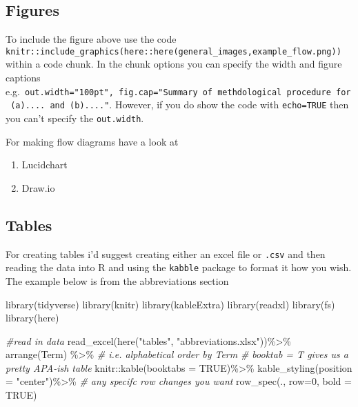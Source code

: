 \documentclass[
  12pt,
  oneside]{book}
\newenvironment{Shaded}{\begin{snugshade}}{\end{snugshade}}
\newcommand{\AttributeTok}[1]{\textcolor[rgb]{0.77,0.63,0.00}{#1}}
\newcommand{\CommentTok}[1]{\textcolor[rgb]{0.56,0.35,0.01}{\textit{#1}}}
\newcommand{\ConstantTok}[1]{\textcolor[rgb]{0.00,0.00,0.00}{#1}}
\newcommand{\DecValTok}[1]{\textcolor[rgb]{0.00,0.00,0.81}{#1}}
\newcommand{\FunctionTok}[1]{\textcolor[rgb]{0.00,0.00,0.00}{#1}}
\newcommand{\NormalTok}[1]{#1}
\newcommand{\SpecialCharTok}[1]{\textcolor[rgb]{0.00,0.00,0.00}{#1}}
\newcommand{\StringTok}[1]{\textcolor[rgb]{0.31,0.60,0.02}{#1}}
\providecommand{\tightlist}{%
  \setlength{\itemsep}{0pt}\setlength{\parskip}{0pt}}
\begin{document}
\hypertarget{figures-1}{%
\subsection{Figures}\label{figures-1}}

To include the figure above use the code \texttt{knitr::include\_graphics(here::here(\textquotesingle{}general\_images\textquotesingle{},\textquotesingle{}example\_flow.png\textquotesingle{}))} within a code chunk. In the chunk options you can specify the width and figure captions e.g.~\texttt{out.width="100pt",\ fig.cap="Summary\ of\ methdological\ procedure\ for\ (a)....\ and\ (b)...."}. However, if you do show the code with \texttt{echo=TRUE} then you can't specify the \texttt{out.width}.

For making flow diagrams have a look at

\begin{enumerate}
\def\labelenumi{\arabic{enumi}.}
\tightlist
\item
  Lucidchart
\item
  Draw.io
\end{enumerate}

\hypertarget{tables-1}{%
\subsection{Tables}\label{tables-1}}

For creating tables i'd suggest creating either an excel file or \texttt{.csv} and then reading the data into R and using the \texttt{kabble} package to format it how you wish. The example below is from the abbreviations section

\begin{Shaded}
\begin{Highlighting}[]
\FunctionTok{library}\NormalTok{(tidyverse)}
\FunctionTok{library}\NormalTok{(knitr)}
\FunctionTok{library}\NormalTok{(kableExtra)}
\FunctionTok{library}\NormalTok{(readxl)}
\FunctionTok{library}\NormalTok{(fs)}
\FunctionTok{library}\NormalTok{(here)}

\CommentTok{\#read in data}
\FunctionTok{read\_excel}\NormalTok{(}\FunctionTok{here}\NormalTok{(}\StringTok{"tables"}\NormalTok{, }\StringTok{"abbreviations.xlsx"}\NormalTok{))}\SpecialCharTok{\%\textgreater{}\%}
  \FunctionTok{arrange}\NormalTok{(Term) }\SpecialCharTok{\%\textgreater{}\%} \CommentTok{\# i.e. alphabetical order by Term}
  \CommentTok{\# booktab = T gives us a pretty APA{-}ish table}
\NormalTok{  knitr}\SpecialCharTok{::}\FunctionTok{kable}\NormalTok{(}\AttributeTok{booktabs =} \ConstantTok{TRUE}\NormalTok{)}\SpecialCharTok{\%\textgreater{}\%} 
  \FunctionTok{kable\_styling}\NormalTok{(}\AttributeTok{position =} \StringTok{"center"}\NormalTok{)}\SpecialCharTok{\%\textgreater{}\%}
  \CommentTok{\# any specifc row changes you want}
    \FunctionTok{row\_spec}\NormalTok{(.,}
  \AttributeTok{row=}\DecValTok{0}\NormalTok{,}
  \AttributeTok{bold =} \ConstantTok{TRUE}\NormalTok{)}
\end{Highlighting}
\end{Shaded}
\end{document}
